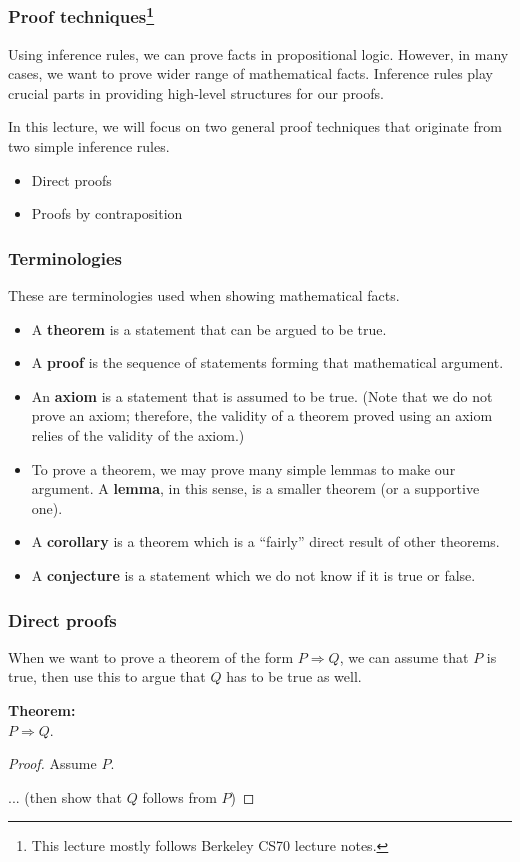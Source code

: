 

\begin{frame}\frametitle{Proof techniques\footnote{This lecture mostly follows Berkeley CS70 lecture notes.}}
  Using inference rules, we can prove facts in propositional logic.
  However, in many cases, we want to prove wider range of mathematical
  facts.  Inference rules play crucial parts in providing high-level
  structures for our proofs. \pause

  In this lecture, we will focus on two general proof techniques that
  originate from two simple inference rules.
  \begin{itemize}
  \item Direct proofs
  \item Proofs by contraposition
  \end{itemize}
\end{frame}

\begin{frame}\frametitle{Terminologies}
  These are terminologies used when showing mathematical facts.
  \begin{itemize}
  \item A {\bf theorem} is a statement that can be argued to be true.
  \item A {\bf proof} is the sequence of statements forming that
    mathematical argument.
  \item An {\bf axiom} is a statement that is assumed to be true.
    (Note that we do not prove an axiom; therefore, the validity of a
    theorem proved using an axiom relies of the validity of the
    axiom.)
  \item To prove a theorem, we may prove many simple lemmas to make
    our argument.  A {\bf lemma}, in this sense, is a smaller theorem
    (or a supportive one).
  \item A {\bf corollary} is a theorem which is a ``fairly'' direct
    result of other theorems.
  \item A {\bf conjecture} is a statement which we do not know if it
    is true or false.
  \end{itemize}
\end{frame}

\begin{frame}\frametitle{Direct proofs}
  When we want to prove a theorem of the form $P\Rightarrow Q$, we can
  assume that $P$ is true, then use this to argue that $Q$ has to be
  true as well.

  \begin{tcolorbox}[title=Direct proofs]
    {\bf Theorem:} \\
      $P\Rightarrow Q$.
    \begin{proof}
      Assume $P$.
      
      ... (then show that $Q$ follows from $P$)
    \end{proof}
  \end{tcolorbox}
\end{frame}

